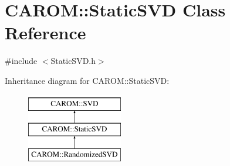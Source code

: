 \hypertarget{class_c_a_r_o_m_1_1_static_s_v_d}{\section{C\-A\-R\-O\-M\-:\-:Static\-S\-V\-D Class Reference}
\label{class_c_a_r_o_m_1_1_static_s_v_d}
}


{\ttfamily \#include $<$Static\-S\-V\-D.\-h$>$}

Inheritance diagram for C\-A\-R\-O\-M\-:\-:Static\-S\-V\-D\-:\begin{figure}[H]
\begin{center}
\leavevmode
\includegraphics[height=3.000000cm]{class_c_a_r_o_m_1_1_static_s_v_d}
\end{center}
\end{figure}
